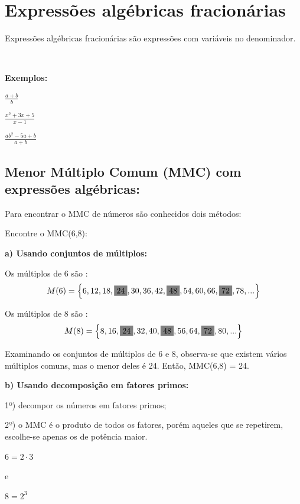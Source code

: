 \section{Expressões algébricas fracionárias}

Expressões algébricas fracionárias são expressões com variáveis no denominador.

~~

\textbf{Exemplos:}
\begin{multicols}{3}
\begin{enumerate}[label=\arabic*)]{\large
\item $\frac{a+b}{b}$

\item $\frac{x^2+3x+5}{x-1}$

\item $\frac{ab^2-5a+b}{a+b}$

}\end{enumerate}
\end{multicols}

\subsection{Menor Múltiplo Comum (MMC) com expressões algébricas:}

Para encontrar o MMC de números são conhecidos dois métodos:

Encontre o MMC(6,8):

\noindent\textbf{a) Usando conjuntos de múltiplos:}

Os múltiplos de 6 são : $$ M(6) = \left\{6,12,18,\colorbox{gray}{24},30,36,42,\colorbox{gray}{48},54,60,66,\colorbox{gray}{72},78,... \right\} $$

Os múltiplos de 8 são : $$ M(8) =  \left\{8,16,\colorbox{gray}{24},32,40,\colorbox{gray}{48},56,64,\colorbox{gray}{72},80,... \right\}$$

Examinando os conjuntos de múltiplos de 6 e 8, observa-se que existem vários múltiplos comuns, mas o menor deles é 24. Então, MMC(6,8) = 24.

\noindent\textbf{b) Usando decomposição em fatores primos:}
    
1º) decompor os números em fatores primos;

2º) o MMC é o produto de todos os fatores, porém aqueles que se repetirem, escolhe-se apenas os de potência maior. 

\begin{multicols}{3}
$6 = 2 \cdot 3$

e

$8 = 2^3$
\end{multicols}

